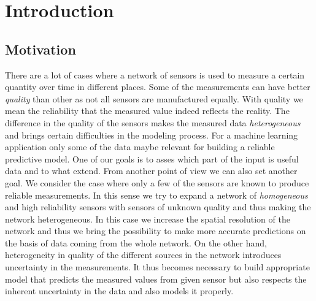 \documentclass[12pt,a4paper,twoside]{scrartcl}
\numberwithin{equation}{section}
\begin{document}
\vfill\vfill\vfill
\clearpage

\pagestyle{plain}

\renewcommand\sectionmark[1]{\markboth{\thesection\quad\MakeUppercase{#1}}{\thesection\quad\MakeUppercase{#1}}}
\renewcommand\subsectionmark[1]{\markright{\thesubsection\quad\MakeUppercase{#1}}}

\tableofcontents
\clearpage
\listoffigures
\clearpage

\pagestyle{normal}
\section{Introduction}\label{sec:intoduction}
\subsection{Motivation}\label{sec:motivation}
There are a lot of cases where a network of sensors is used to measure a certain quantity over time in different places. Some of the measurements can have better \emph{quality} than other as not all sensors are manufactured equally. With quality we mean the reliability that the measured value indeed reflects the reality. The difference in the quality of the sensors makes the measured data \emph{heterogeneous} and brings certain difficulties in the modeling process. For a machine learning application only some of the data maybe relevant for building a reliable predictive model. One of our goals is to asses which part of the input is useful data and to what extend. From another point of view we can also set another goal. We consider the case where only a few of the sensors are known to produce reliable measurements. In this sense we try to expand a network of \emph{homogeneous} and high reliability sensors with sensors of unknown quality and thus making the network heterogeneous. In this case we increase the spatial resolution of the network and thus we bring the possibility to make more accurate predictions on the basis of data coming from the whole network. On the other hand, heterogeneity in quality of the different sources in the network introduces uncertainty in the measurements. It thus becomes necessary to build appropriate model that predicts the measured values from given sensor but also respects the inherent uncertainty in the data and also models it properly.
\end{document}

